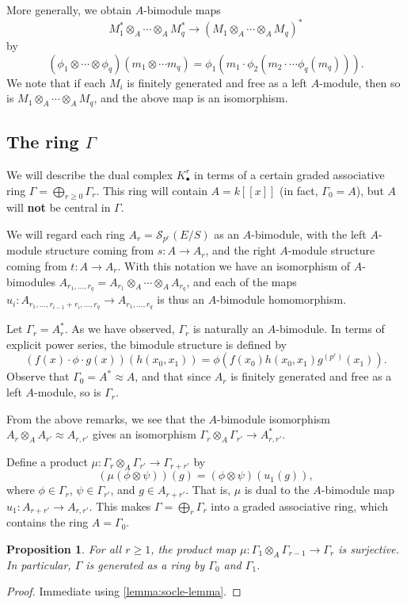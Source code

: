 \documentclass[11pt]{amsart}
\numberwithin{equation}{section}
\theoremstyle{plain}
\newtheorem{prop}[subsection]{Proposition}
\theoremstyle{remark}
\theoremstyle{plain}
\begin{document}
More generally, we obtain $A$-bimodule maps
\[
M_1^*\otimes_A\cdots\otimes_A M_q^* {\rightarrow} (M_1\otimes_A \cdots \otimes_A
M_q)^* 
\]
by
\[
(\phi_1\otimes\cdots\otimes \phi_q)(m_1\otimes \cdots m_q) = \phi_1(
m_1\cdot \phi_2( m_2\cdot \cdots \phi_q(m_q))).
\]
We note that if each $M_i$ is finitely generated and free as a left
$A$-module, then so is $M_1\otimes_A \cdots \otimes_A M_q$, and the
above map is an isomorphism.   

\subsection{The ring $\Gamma$}

We will describe the dual complex $K^r_\bullet$ 
in terms of a certain graded associative ring
$\Gamma=\bigoplus_{r\geq0} \Gamma_r$.  This ring will contain $A=k{[\![{x}]\!]}$ (in
fact, $\Gamma_0=A$), but $A$ will \textbf{not} be central in
$\Gamma$.

We will regard each ring $A_r={\mathscr{S}}_{p^r}(E/S)$ as an $A$-bimodule, with
the left 
$A$-module structure coming from $s\colon A{\rightarrow} A_r$, and the right
$A$-module structure coming from $t\colon A{\rightarrow} A_r$.  With this
notation we have an isomorphism of $A$-bimodules
$A_{r_1,\dots,r_q}= A_{r_1}\otimes_A \cdots \otimes_A A_{r_q}$, and
each of the maps $u_i\colon A_{r_1,\dots,
  r_{i-1}+r_i,\dots,r_q}{\rightarrow} A_{r_1,\dots,r_q}$ is thus an $A$-bimodule
homomorphism. 

Let $\Gamma_r=A_r^*$.  As we have observed, $\Gamma_r$ is naturally an
$A$-bimodule.  In terms of explicit power series, the bimodule
structure is defined by
\[
(f(x)\cdot \phi\cdot g(x))(h(x_0,x_1))=
\phi(f(x_0)h(x_0,x_1)g^{(p^r)}(x_1)).
\]
Observe that $\Gamma_0=A^*\approx A$, and that since $A_r$ is finitely
generated and free as a left $A$-module, so is $\Gamma_r$.

From the above remarks, we see that the $A$-bimodule isomorphism
$A_r\otimes_A A_{r'}\approx 
A_{r,r'}$ gives an isomorphism $\Gamma_r\otimes_A
\Gamma_{r'}{\rightarrow} A_{r,r'}^*$.  

Define a product $\mu\colon  \Gamma_r\otimes_A \Gamma_{r'}{\rightarrow}
\Gamma_{r+r'}$ by
\[
(\mu(\phi\otimes \psi))(g)= (\phi\otimes \psi)(u_1(g)),
\]
where $\phi\in \Gamma_r$, $\psi\in \Gamma_{r'}$, and $g\in A_{r+r'}$.
That is, $\mu$ is dual to the $A$-bimodule map $u_1\colon A_{r+r'}{\rightarrow}
A_{r,r'}$. 
This makes $\Gamma=\bigoplus_r \Gamma_r$ into a graded
associative ring, which contains the ring $A=\Gamma_0$.
\begin{prop}\label{prop:gamma-gen-by-degree-1}
For all $r\geq 1$, the product map $\mu\colon \Gamma_1\otimes_A
\Gamma_{r-1}{\rightarrow} \Gamma_r$ is surjective.  In particular, $\Gamma$ is
generated as a ring by $\Gamma_0$ and $\Gamma_1$.
\end{prop}
\begin{proof}
Immediate using \eqref{lemma:socle-lemma}.
\end{proof}
\end{document}
